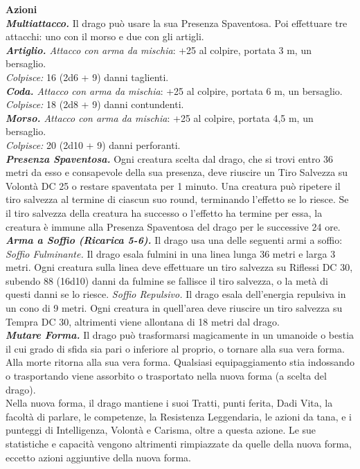 \begin{multicols}{2}
\smallskip\textbf{Azioni}\\
\emph{\textbf{Multiattacco.}} Il drago può usare la sua Presenza Spaventosa. Poi effettuare tre attacchi: uno con il morso e due con gli artigli.\\
\emph{\textbf{Artiglio.} Attacco con arma da mischia}: +25 al colpire, portata 3 m, un bersaglio.\\
\emph{Colpisce:} 16 (2d6 + 9) danni taglienti.\\
\emph{\textbf{Coda.} Attacco con arma da mischia}: +25 al colpire, portata 6 m, un bersaglio.\\
\emph{Colpisce:} 18 (2d8 + 9) danni contundenti.\\
\emph{\textbf{Morso.} Attacco con arma da mischia}: +25 al colpire, portata 4,5 m, un bersaglio.\\
\emph{Colpisce:} 20 (2d10 + 9) danni perforanti.\\
\emph{\textbf{Presenza Spaventosa.}} Ogni creatura scelta dal drago, che si trovi entro 36 metri da esso e consapevole della sua presenza, deve riuscire un Tiro Salvezza su Volontà DC  25 o restare spaventata per 1 minuto. Una creatura può ripetere il tiro salvezza al termine di ciascun suo round, terminando l'effetto se lo riesce. Se il tiro salvezza della creatura ha successo o l'effetto ha termine per essa, la creatura è immune alla Presenza Spaventosa del drago per le successive 24 ore.\\
\emph{\textbf{Arma a Soffio (Ricarica 5-6).}} Il drago usa una delle seguenti armi a soffio:\\
\emph{Soffio Fulminante.} Il drago esala fulmini in una linea lunga 36 metri e larga 3 metri. Ogni creatura sulla linea deve effettuare un tiro salvezza su Riflessi DC  30, subendo 88 (16d10) danni da fulmine se fallisce il tiro salvezza, o la metà di questi danni se lo riesce. \emph{Soffio Repulsivo.} Il drago esala dell'energia repulsiva in un cono di 9 metri. Ogni creatura in quell'area deve riuscire un tiro salvezza su Tempra DC  30, altrimenti viene allontana di 18 metri dal drago.\\
\emph{\textbf{Mutare Forma.}} Il drago può trasformarsi magicamente in un umanoide o bestia il cui grado di sfida sia pari o inferiore al proprio, o tornare alla sua vera forma. Alla morte ritorna alla sua vera forma. Qualsiasi equipaggiamento stia indossando o trasportando viene assorbito o trasportato nella nuova forma (a scelta del drago).\\
Nella nuova forma, il drago mantiene i suoi Tratti, punti ferita, Dadi Vita, la facoltà di parlare, le competenze, la Resistenza Leggendaria, le azioni da tana, e i punteggi di Intelligenza, Volontà e Carisma, oltre a questa azione. Le sue statistiche e capacità vengono altrimenti rimpiazzate da quelle della nuova forma, eccetto azioni aggiuntive della nuova forma.\\

\end{multicols}
